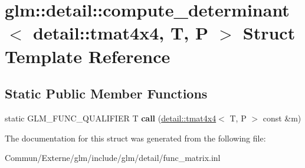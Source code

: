 \hypertarget{structglm_1_1detail_1_1compute__determinant_3_01detail_1_1tmat4x4_00_01_t_00_01_p_01_4}{}\section{glm\+:\+:detail\+:\+:compute\+\_\+determinant$<$ detail\+:\+:tmat4x4, T, P $>$ Struct Template Reference}
\label{structglm_1_1detail_1_1compute__determinant_3_01detail_1_1tmat4x4_00_01_t_00_01_p_01_4}
\subsection*{Static Public Member Functions}
\begin{DoxyCompactItemize}
\item 
static G\+L\+M\+\_\+\+F\+U\+N\+C\+\_\+\+Q\+U\+A\+L\+I\+F\+I\+ER T {\bfseries call} (\hyperlink{structglm_1_1detail_1_1tmat4x4}{detail\+::tmat4x4}$<$ T, P $>$ const \&m)\hypertarget{structglm_1_1detail_1_1compute__determinant_3_01detail_1_1tmat4x4_00_01_t_00_01_p_01_4_aa7fa7eae68f9b10c3ac3a80bca669c98}{}\label{structglm_1_1detail_1_1compute__determinant_3_01detail_1_1tmat4x4_00_01_t_00_01_p_01_4_aa7fa7eae68f9b10c3ac3a80bca669c98}

\end{DoxyCompactItemize}


The documentation for this struct was generated from the following file\+:\begin{DoxyCompactItemize}
\item 
Commun/\+Externe/glm/include/glm/detail/func\+\_\+matrix.\+inl\end{DoxyCompactItemize}
